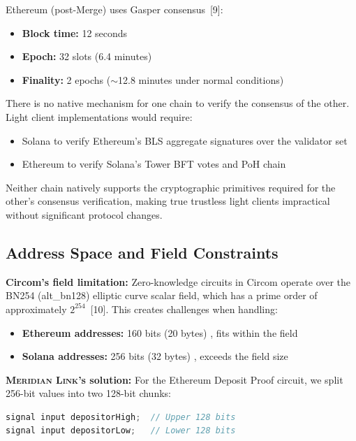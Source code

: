 \documentclass[11pt,a4paper,twoside]{article}
\newcommand{\protocol}{\textsc{Meridian Link}}
\begin{document}
Ethereum (post-Merge) uses Gasper consensus~[9]:
\begin{itemize}
    \item \textbf{Block time:} 12 seconds
    \item \textbf{Epoch:} 32 slots (6.4 minutes)
    \item \textbf{Finality:} 2 epochs ($\sim$12.8 minutes under normal conditions)
\end{itemize}

There is no native mechanism for one chain to verify the consensus of the other. Light client implementations would require:
\begin{itemize}
    \item Solana to verify Ethereum's BLS aggregate signatures over the validator set
    \item Ethereum to verify Solana's Tower BFT votes and PoH chain
\end{itemize}

Neither chain natively supports the cryptographic primitives required for the other's consensus verification, making true trustless light clients impractical without significant protocol changes.

\subsection{Address Space and Field Constraints}

\textbf{Circom's field limitation:} Zero-knowledge circuits in Circom operate over the BN254 (alt\_bn128) elliptic curve scalar field, which has a prime order of approximately $2^{254}$~[10]. This creates challenges when handling:

\begin{itemize}
    \item \textbf{Ethereum addresses:} 160 bits (20 bytes) , fits within the field
    \item \textbf{Solana addresses:} 256 bits (32 bytes) , exceeds the field size
\end{itemize}

\textbf{\protocol{}'s solution:} For the Ethereum Deposit Proof circuit, we split 256-bit values into two 128-bit chunks:

\begin{lstlisting}[language=C,caption={Address Splitting in Circom}]
signal input depositorHigh;  // Upper 128 bits
signal input depositorLow;   // Lower 128 bits
\end{lstlisting}
\end{document}
